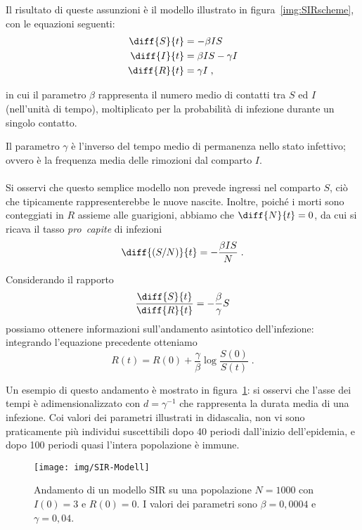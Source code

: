 Il risultato di queste assunzioni è il modello illustrato in figura~\ref{img:SIRscheme}, con le equazioni seguenti:
\begin{align}
    \diff{S}{t} &= - \beta I S \label{eq:sirS} \\
    \diff{I}{t} &= \beta I S - \gamma I \\
    \diff{R}{t} &= \gamma I \label{eq:sirR} \; ,
\end{align}

in cui il parametro $\beta$ rappresenta il numero medio di contatti tra $S$ ed $I$ (nell'unità di tempo),
moltiplicato per la probabilità di infezione durante un singolo contatto.

Il parametro $\gamma$ è l'inverso del tempo medio di permanenza nello stato infettivo; ovvero è la frequenza
media delle rimozioni dal comparto $I$.

\paragraph{}
Si osservi che questo semplice modello non prevede ingressi nel comparto $S$, ciò che tipicamente rappresenterebbe
le nuove nascite.
Inoltre, poiché i morti sono conteggiati in $R$ assieme alle guarigioni, abbiamo che $\diff{N}{t} = 0$,
da cui si ricava il tasso \emph{pro~capite} di infezioni
$$\diff{(S/N)}{t} = - \frac{\beta I S}{N} \; .$$

Considerando il rapporto
$$\frac{ \diff{S}{t} }{ \diff{R}{t} } = - \frac{\beta}{\gamma} S$$
possiamo ottenere informazioni sull'andamento asintotico dell'infezione: integrando l'equazione precedente otteniamo
$$R(t) = R(0) + \frac{\gamma}{\beta} \log \frac{S(0)}{S(t)} \; .$$

Un esempio di questo andamento è mostrato in figura~\ref{img:sirmodell}: si osservi che l'asse dei tempi è
adimensionalizzato con $d=\gamma^{-1}$ che rappresenta la durata media di una infezione.
Coi valori dei parametri illustrati in didascalia, non vi sono praticamente più individui suscettibili dopo
40 periodi dall'inizio dell'epidemia, e dopo 100 periodi quasi l'intera popolazione è immune.

\begin{figure}[hb]
    \centering
    \texttt{[image: img/SIR-Modell]}

    \caption[Modello SIR]{Andamento di un modello SIR su una popolazione $N=1000$ con $I(0)=3$ e $R(0)=0$.
        I valori dei parametri sono $\beta=0,0004$ e $\gamma=0,04$.}
    \label{img:sirmodell}
\end{figure}


